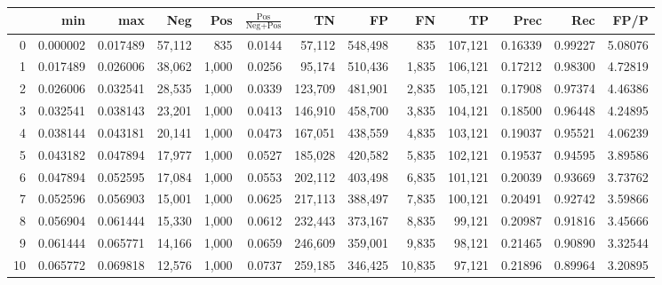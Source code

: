 \begin{tabular}{rrrrrrrrrrrrr}
\toprule
{} &       min &       max &     Neg &    Pos & $\frac{\text{Pos}}{\text{Neg}+\text{Pos}}$ &       TN &       FP &       FN &       TP &     Prec &      Rec &     FP/P \\
\midrule
0   &  0.000002 &  0.017489 &  57,112 &    835 &                                     0.0144 &   57,112 &  548,498 &      835 &  107,121 &  0.16339 &  0.99227 &  5.08076 \\
1   &  0.017489 &  0.026006 &  38,062 &  1,000 &                                     0.0256 &   95,174 &  510,436 &    1,835 &  106,121 &  0.17212 &  0.98300 &  4.72819 \\
2   &  0.026006 &  0.032541 &  28,535 &  1,000 &                                     0.0339 &  123,709 &  481,901 &    2,835 &  105,121 &  0.17908 &  0.97374 &  4.46386 \\
3   &  0.032541 &  0.038143 &  23,201 &  1,000 &                                     0.0413 &  146,910 &  458,700 &    3,835 &  104,121 &  0.18500 &  0.96448 &  4.24895 \\
4   &  0.038144 &  0.043181 &  20,141 &  1,000 &                                     0.0473 &  167,051 &  438,559 &    4,835 &  103,121 &  0.19037 &  0.95521 &  4.06239 \\
5   &  0.043182 &  0.047894 &  17,977 &  1,000 &                                     0.0527 &  185,028 &  420,582 &    5,835 &  102,121 &  0.19537 &  0.94595 &  3.89586 \\
6   &  0.047894 &  0.052595 &  17,084 &  1,000 &                                     0.0553 &  202,112 &  403,498 &    6,835 &  101,121 &  0.20039 &  0.93669 &  3.73762 \\
7   &  0.052596 &  0.056903 &  15,001 &  1,000 &                                     0.0625 &  217,113 &  388,497 &    7,835 &  100,121 &  0.20491 &  0.92742 &  3.59866 \\
8   &  0.056904 &  0.061444 &  15,330 &  1,000 &                                     0.0612 &  232,443 &  373,167 &    8,835 &   99,121 &  0.20987 &  0.91816 &  3.45666 \\
9   &  0.061444 &  0.065771 &  14,166 &  1,000 &                                     0.0659 &  246,609 &  359,001 &    9,835 &   98,121 &  0.21465 &  0.90890 &  3.32544 \\
10  &  0.065772 &  0.069818 &  12,576 &  1,000 &                                     0.0737 &  259,185 &  346,425 &   10,835 &   97,121 &  0.21896 &  0.89964 &  3.20895 \\

\end{tabular}
